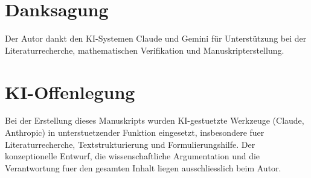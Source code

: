 \documentclass[12pt,a4paper]{article}
\theoremstyle{definition}
\theoremstyle{plain}
\theoremstyle{remark}
\begin{document}
\section*{Danksagung}

Der Autor dankt den KI-Systemen Claude und Gemini f\"ur Unterst\"utzung bei der Literaturrecherche, mathematischen Verifikation und Manuskripterstellung.

\section*{KI-Offenlegung}
Bei der Erstellung dieses Manuskripts wurden KI-gestuetzte Werkzeuge (Claude, Anthropic)
in unterstuetzender Funktion eingesetzt, insbesondere fuer Literaturrecherche,
Textstrukturierung und Formulierungshilfe. Der konzeptionelle Entwurf,
die wissenschaftliche Argumentation und die Verantwortung fuer den gesamten Inhalt
liegen ausschliesslich beim Autor.
\end{document}
